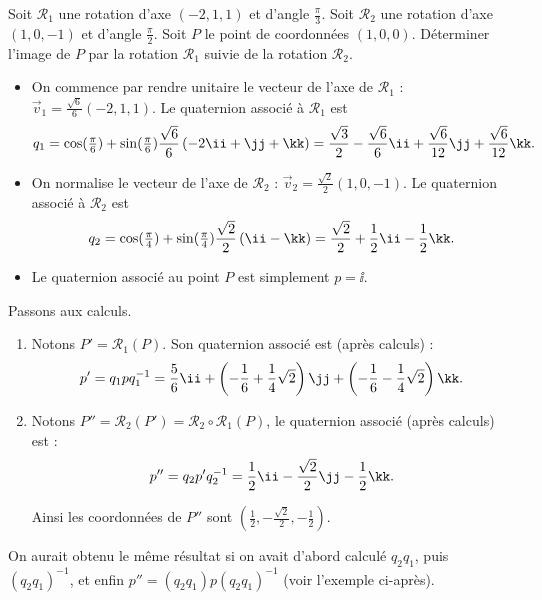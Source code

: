 \documentclass[11pt,class=report,crop=false]{standalone}
\begin{document}
\begin{exemple}
\label{ex:quaternion}
Soit $\mathcal{R}_1$ une rotation d'axe $(-2,1,1)$ et d'angle $\frac\pi3$.
Soit $\mathcal{R}_2$ une rotation d'axe $(1,0,-1)$ et d'angle $\frac\pi2$.
Soit $P$ le point de coordonnées $(1,0,0)$. Déterminer l'image de $P$ par la rotation $\mathcal{R}_1$ suivie de la rotation $\mathcal{R}_2$.

\begin{itemize}
  \item On commence par rendre unitaire le vecteur de l'axe de $\mathcal{R}_1$ :  $\vec v_1 = \frac{\sqrt6}{6}(-2,1,1)$. 
  Le quaternion associé à $\mathcal{R}_1$ est 
  $$q_1 
= \cos(\tfrac\pi6) + \sin(\tfrac\pi6) \frac{\sqrt6}{6} \left( -2\ii + \jj + \kk \right)
= \frac{\sqrt3}{2} -\frac{\sqrt6}{6}\ii + \frac{\sqrt6}{12}\jj + \frac{\sqrt6}{12}\kk.$$

  \item On normalise le vecteur de l'axe de $\mathcal{R}_2$ :  $\vec v_2 = \frac{\sqrt2}{2}(1,0,-1)$. Le quaternion associé à $\mathcal{R}_2$ est 
$$q_2 
= \cos(\tfrac\pi4) + \sin(\tfrac\pi4)\frac{\sqrt2}{2} \left( \ii -\kk \right)
= \frac{\sqrt2}{2} + \frac12\ii -\frac12\kk.$$
 
 \item Le quaternion associé au point $P$ est simplement $p = \ii$.
\end{itemize}

Passons aux calculs.

\begin{enumerate}
  \item Notons $P' = \mathcal{R}_1(P)$. Son quaternion associé est (après calculs) :
  $$p' = q_1 p q_1^{-1} = 
\frac56 \ii +
\left( -\frac16+\frac14\sqrt{2} \right) \jj +
\left( -\frac16-\frac14\sqrt{2} \right) \kk.$$


  \item Notons $P'' = \mathcal{R}_2(P') = \mathcal{R}_2 \circ \mathcal{R}_1(P)$, le quaternion associé (après calculs) est :
  $$p'' = q_2 p' q_2^{-1} = 
 \frac12\ii 
 -\frac{\sqrt2}{2}\jj 
 -\frac12\kk.$$

Ainsi les coordonnées de $P''$ sont $(\frac12,-\frac{\sqrt2}{2},  -\frac12)$.


\end{enumerate}
On aurait obtenu le même résultat si on avait d'abord calculé $q_2q_1$, puis $(q_2q_1)^{-1}$, et enfin $p'' = (q_2q_1) p (q_2q_1)^{-1}$ (voir l'exemple ci-après).
\end{exemple}
\end{document}
